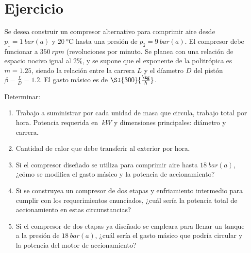 \section{Ejercicio}\label{ej:Chap06Ejercicio01}

Se desea construir un compresor alternativo para comprimir aire desde $p_1=\SI{1}{bar(a)}$ y $\SI{20}{\celsius}$ hasta una presión de $p_2=\SI{9}{bar(a)}$. El compresor debe funcionar a $\SI{350}{rpm}$ (revoluciones por minuto. Se planea con una relación de espacio nocivo igual al $2\%$, y se supone que el exponente de la politrópica es $m=1.25$, siendo la relación entre la carrera $L$ y el díametro $D$ del pistón $\beta=\frac{L}{D}=1.2$. El gasto másico es de $\SI{300}{\frac{\kg}{h}}$.

Determinar:
\begin{enumerate}
    \item Trabajo a suministrar por cada unidad de masa que circula, trabajo total por hora. Potencia requerida en $\SI{}{kW}$ y dimensiones principales: diámetro y carrera.
    \item Cantidad de calor que debe transferir al exterior por hora.
    \item Si el compresor diseñado se utiliza para comprimir aire hasta $\SI{18}{bar(a)}$, ¿cómo se modifica el gasto másico y la potencia de accionamiento?
    \item Si se construyea un compresor de dos etapas y enfriamiento intermedio para cumplir con los requerimientos enunciados, ¿cuál sería la potencia total de accionamiento en estas circunstancias?
    \item Si el compresor de dos etapas ya diseñado se empleara para llenar un tanque a la presión de $\SI{18}{bar(a)}$, ¿cuál sería el gasto másico que podría circular y la potencia del motor de accionamiento?
\end{enumerate}
